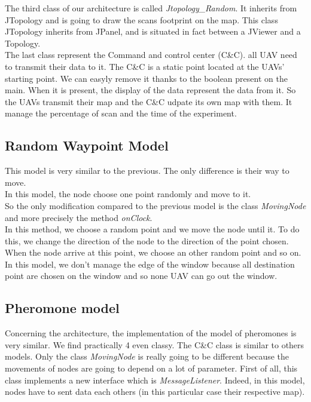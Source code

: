 The third class of our architecture is called \textit{Jtopology\_Random}. It inherits from JTopology and is going to draw the scans footprint on the map. This class JTopology inherits from JPanel, and is situated in fact between a JViewer and a Topology.\\

The last class represent the Command and control center (C\&C). all UAV need to transmit their data to it. The C\&C is a static point located at the UAVs' starting point. We can easyly remove it thanks to the boolean present on the main. When it is present, the display of the data represent the data from it. So the UAVs transmit their map and the C\&C udpate its own map with them. It manage the percentage of scan and the time of the experiment.

\subsection{Random Waypoint Model}

This model is very similar to the previous. The only difference is their way to move.\\
In this model, the node choose one point randomly and move to it.\\
So the only modification compared to the previous model is the class \textit{MovingNode} and more precisely the method \textit{onClock}.\\
In this method, we choose a random point and we move the node until it. To do this, we change the direction of the node to the direction of the point chosen. When the node arrive at this point, we choose an other random point and so on.\\
In this model, we don't manage the edge of the window because all destination point are chosen on the window and so none UAV can go out the window.

\subsection{Pheromone model}

Concerning the architecture, the implementation of the model of pheromones is very similar. We find practically 4 even classy. The C\&C class is similar to others models. Only the class \textit{MovingNode} is really going to be different because the movements of nodes are going to depend on a lot of parameter. First of all, this class implements a new interface which is \textit{MessageListener}. Indeed, in this model, nodes have to sent data each others (in this particular case their respective map).\\

